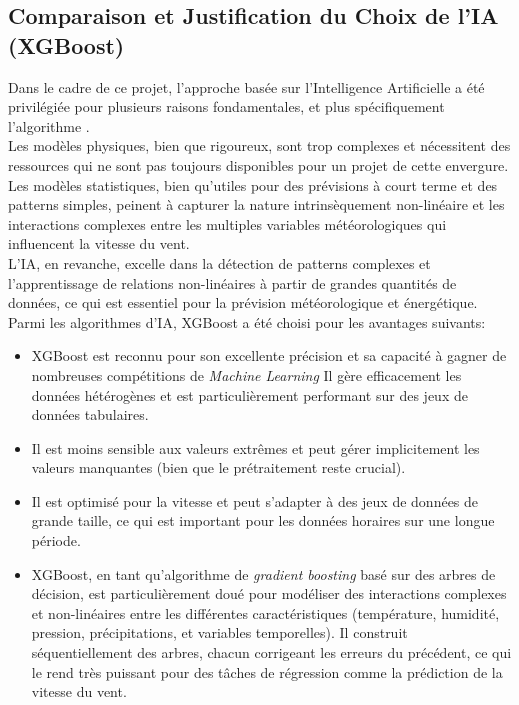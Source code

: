 \documentclass[12pt]{article}
\begin{document}
\subsection{Comparaison et Justification du Choix de l'IA (XGBoost)}
Dans le cadre de ce projet, l'approche basée sur l'Intelligence Artificielle a été privilégiée pour plusieurs raisons fondamentales, et plus spécifiquement l'algorithme  \textbf{\color{blue}{XGBoost (eXtreme Gradient Boosting)}}.\\
Les modèles physiques, bien que rigoureux, sont trop complexes et nécessitent des ressources qui ne sont pas toujours disponibles pour un projet de cette envergure. Les modèles statistiques, bien qu'utiles pour des prévisions à court terme et des patterns simples, peinent à capturer la nature intrinsèquement non-linéaire et les interactions complexes entre les multiples variables météorologiques qui influencent la vitesse du vent.\\
L'IA, en revanche, excelle dans la détection de patterns complexes et l'apprentissage de relations non-linéaires à partir de grandes quantités de données, ce qui est essentiel pour la prévision météorologique et énergétique. Parmi les algorithmes d'IA, XGBoost a été choisi pour les avantages suivants:
\begin{itemize}
	\item \textbf{\color{blue}{Haute Performance et Précision:}} XGBoost est reconnu pour son excellente précision et sa capacité à gagner de nombreuses compétitions de \textit{Machine Learning} Il gère efficacement les données hétérogènes et est particulièrement performant sur des jeux de données tabulaires.
	\item \textbf{\color{blue}{Robustesse aux Valeurs Aberrantes et Manquantes:}} Il est moins sensible aux valeurs extrêmes et peut gérer implicitement les valeurs manquantes (bien que le prétraitement reste crucial).
	\item \textbf{\color{blue}{Vitesse et Scalabilité:}} Il est optimisé pour la vitesse et peut s'adapter à des jeux de données de grande taille, ce qui est important pour les données horaires sur une longue période.
	\item \textbf{\color{blue}{Capacité à Gérer les Relations Complexes:}} XGBoost, en tant qu'algorithme de \textit{gradient boosting} basé sur des arbres de décision, est particulièrement doué pour modéliser des interactions complexes et non-linéaires entre les différentes caractéristiques (température, humidité, pression, précipitations, et variables temporelles). Il construit séquentiellement des arbres, chacun corrigeant les erreurs du précédent, ce qui le rend très puissant pour des tâches de régression comme la prédiction de la vitesse du vent.
\end{itemize}
\end{document}
